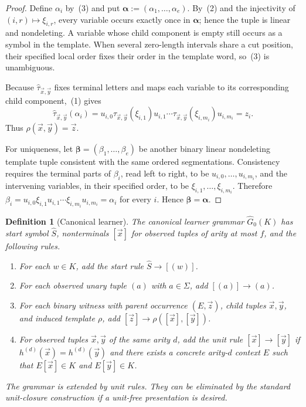 \documentclass[11pt,a4paper]{article}
\newtheorem{definition}[theorem]{Definition}
\theoremstyle{remark}
\newcommand{\tuple}[1]{\vec{#1}}
\begin{document}
\begin{proof}
Define \(\alpha_i\) by~\textup{(3)} and put
\(\boldsymbol\alpha:=(\alpha_1,\ldots,\alpha_e)\).  By~\textup{(2)} and the
injectivity of \((i,r)\mapsto\xi_{i,r}\), every variable occurs exactly once
in \(\boldsymbol\alpha\); hence the tuple is linear and nondeleting.  A
variable whose child component is empty still occurs as a symbol in the
template.  When several zero-length intervals share a cut position, their
specified local order fixes their order in the template word, so~\textup{(3)}
is unambiguous.

Because \(\widehat\tau_{\tuple x,\tuple y}\) fixes terminal letters and maps
each variable to its corresponding child component,~\textup{(1)} gives
\[
  \widehat\tau_{\tuple x,\tuple y}(\alpha_i)
  =u_{i,0}\tau_{\tuple x,\tuple y}(\xi_{i,1})u_{i,1}\cdots
   \tau_{\tuple x,\tuple y}(\xi_{i,m_i})u_{i,m_i}
  =z_i.
\]
Thus \(\rho(\tuple x,\tuple y)=\tuple z\).

For uniqueness, let
\(\boldsymbol\beta=(\beta_1,\ldots,\beta_e)\) be another binary linear
nondeleting template tuple consistent with the same ordered segmentations.
Consistency requires the terminal parts of \(\beta_i\), read left to right, to
be \(u_{i,0},\ldots,u_{i,m_i}\), and the intervening variables, in their
specified order, to be \(\xi_{i,1},\ldots,\xi_{i,m_i}\).  Therefore
\(\beta_i=u_{i,0}\xi_{i,1}u_{i,1}\cdots
\xi_{i,m_i}u_{i,m_i}=\alpha_i\) for every \(i\).  Hence
\(\boldsymbol\beta=\boldsymbol\alpha\).
\end{proof}

\begin{definition}[Canonical learner]
\label{def:learner}
The canonical learner grammar \(\widehat G_0(K)\) has start symbol
\(\widehat S\), nonterminals \([\tuple x]\) for observed tuples of arity at most
\(f\), and the following rules.
\begin{enumerate}[label=(\roman*),leftmargin=*]
\item For each \(w\in K\), add the start rule \(\widehat S\to[(w)]\).
\item For each observed unary tuple \((a)\) with \(a\in\Sigma\), add
\([(a)]\to(a)\).
\item For each binary witness with parent occurrence \((E,\tuple z)\), child
tuples \(\tuple x,\tuple y\), and induced template \(\rho\), add
\([\tuple z]\to\rho([\tuple x],[\tuple y])\).
\item For observed tuples \(\tuple x,\tuple y\) of the same arity \(d\), add the
unit rule \([\tuple x]\to[\tuple y]\) if \(h^{(d)}(\tuple x)=h^{(d)}(\tuple y)\)
and there exists a concrete arity-\(d\) context \(E\) such that
\(E[\tuple x]\in K\) and \(E[\tuple y]\in K\).
\end{enumerate}
The grammar is extended by unit rules.  They can be eliminated by the standard
unit-closure construction if a unit-free presentation is desired.
\end{definition}
\end{document}
